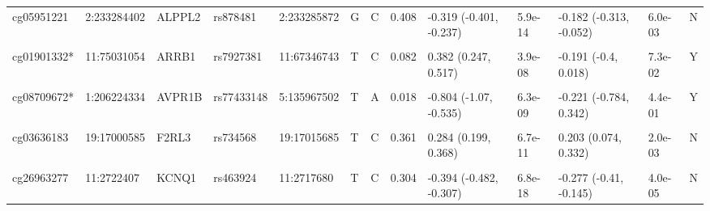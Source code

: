 \documentclass[11pt,twoside]{bristolthesis}
\begin{document}
\begin{landscape}
\begin{table}[!h]
{\begin{tabular}[t]{lllllllllllll}
\addlinespace
cg05951221 & 2:233284402 & ALPPL2 & rs878481 & 2:233285872 & G & C & 0.408 & -0.319 (-0.401, -0.237) & 5.9e-14 & -0.182 (-0.313, -0.052) & 6.0e-03 & N\\
\cellcolor{gray!6}{cg21566642*} & \cellcolor{gray!6}{2:233284661} & \cellcolor{gray!6}{ALPPL2} & \cellcolor{gray!6}{rs3748971} & \cellcolor{gray!6}{2:233250683} & \cellcolor{gray!6}{T} & \cellcolor{gray!6}{C} & \cellcolor{gray!6}{0.074} & \cellcolor{gray!6}{-0.593 (-0.743, -0.443)} & \cellcolor{gray!6}{2.7e-14} & \cellcolor{gray!6}{0.111 (-0.115, 0.338)} & \cellcolor{gray!6}{3.4e-01} & \cellcolor{gray!6}{N}\\
cg01901332* & 11:75031054 & ARRB1 & rs7927381 & 11:67346743 & T & C & 0.082 & 0.382 (0.247, 0.517) & 3.9e-08 & -0.191 (-0.4, 0.018) & 7.3e-02 & Y\\
\cellcolor{gray!6}{cg01901332*} & \cellcolor{gray!6}{11:75031054} & \cellcolor{gray!6}{ARRB1} & \cellcolor{gray!6}{rs13087163} & \cellcolor{gray!6}{3:77329538} & \cellcolor{gray!6}{A} & \cellcolor{gray!6}{C} & \cellcolor{gray!6}{0.390} & \cellcolor{gray!6}{-0.194 (-0.263, -0.124)} & \cellcolor{gray!6}{5.8e-08} & \cellcolor{gray!6}{0.11 (-0.019, 0.239)} & \cellcolor{gray!6}{9.4e-02} & \cellcolor{gray!6}{Y}\\
cg08709672* & 1:206224334 & AVPR1B & rs77433148 & 5:135967502 & T & A & 0.018 & -0.804 (-1.07, -0.535) & 6.3e-09 & -0.221 (-0.784, 0.342) & 4.4e-01 & Y\\
\addlinespace
\cellcolor{gray!6}{cg25305703} & \cellcolor{gray!6}{8:128378218} & \cellcolor{gray!6}{CASC21} & \cellcolor{gray!6}{rs9643220} & \cellcolor{gray!6}{8:128386926} & \cellcolor{gray!6}{A} & \cellcolor{gray!6}{G} & \cellcolor{gray!6}{0.227} & \cellcolor{gray!6}{0.343 (0.247, 0.440)} & \cellcolor{gray!6}{7.1e-12} & \cellcolor{gray!6}{0.232 (0.078, 0.385)} & \cellcolor{gray!6}{3.0e-03} & \cellcolor{gray!6}{N}\\
cg03636183 & 19:17000585 & F2RL3 & rs734568 & 19:17015685 & T & C & 0.361 & 0.284 (0.199, 0.368) & 6.7e-11 & 0.203 (0.074, 0.332) & 2.0e-03 & N\\
\cellcolor{gray!6}{cg09935388} & \cellcolor{gray!6}{1:92947588} & \cellcolor{gray!6}{GFI1} & \cellcolor{gray!6}{rs17518433} & \cellcolor{gray!6}{1:92599172} & \cellcolor{gray!6}{A} & \cellcolor{gray!6}{T} & \cellcolor{gray!6}{0.236} & \cellcolor{gray!6}{-0.330 (-0.421, -0.240)} & \cellcolor{gray!6}{1.8e-12} & \cellcolor{gray!6}{-0.186 (-0.339, -0.033)} & \cellcolor{gray!6}{1.7e-02} & \cellcolor{gray!6}{N}\\
cg26963277 & 11:2722407 & KCNQ1 & rs463924 & 11:2717680 & T & C & 0.304 & -0.394 (-0.482, -0.307) & 6.8e-18 & -0.277 (-0.41, -0.145) & 4.0e-05 & N\\

\end{tabular}}
\end{table}
\end{landscape}
\end{document}
